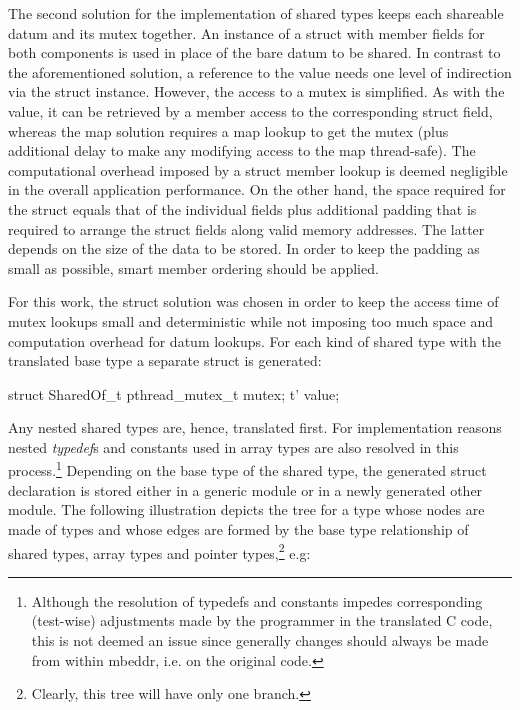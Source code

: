 The second solution for the implementation of shared types keeps each shareable datum and its mutex together. An instance of a struct with member fields for both components is used in place of the bare datum to be shared. In contrast to the aforementioned solution, a reference to the value  needs one level of indirection via the struct instance. However, the access to a mutex is simplified. As with the value, it can be retrieved by a member access to the corresponding struct field, whereas the map solution requires a map lookup to get the mutex (plus additional delay to make any modifying access to the map thread-safe). The computational overhead imposed by a struct member lookup is deemed negligible in the overall application performance. On the other hand, the space required for the struct equals that of the individual fields plus additional padding \cite[pp.~303 ff.]{LinuxSystemProgramming} that is required to arrange the struct fields along valid memory addresses. The latter depends on the size of the data to be stored. In order to keep the padding as small as possible, smart member ordering should be applied. 

For this work, the struct solution was chosen in order to keep the access time of mutex lookups small and deterministic while not imposing too much space and computation overhead for datum lookups. For each kind of shared type  with the translated base type  a separate struct is generated:
\begin{ccode}
struct SharedOf_t {
  pthread_mutex_t mutex;
  t' value;
}
\end{ccode}
Any nested shared types are, hence, translated first. For implementation reasons nested \textit{typedef}s and constants used in array types are also resolved in this process.\footnote{Although the resolution of typedefs and constants impedes corresponding (test-wise) adjustments made by the programmer in the translated C code, this is not deemed an issue since generally changes should always be made from within mbeddr, i.e. on the original code.} Depending on the base type of the shared type, the generated struct declaration is stored either in a generic module or in a newly generated other module. The following illustration depicts the tree for a type  whose nodes are made of types and whose edges are formed by the base type relationship of shared types, array types and pointer types,\footnote{Clearly, this tree will have only one branch.} e.g: 


